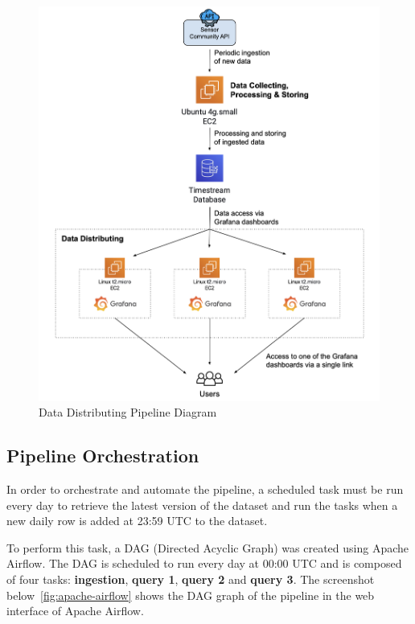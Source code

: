 \documentclass[12pt,oneside]{book} %
\begin{document}
\begin{figure}[H]
    \centering
    \includegraphics[width=1\linewidth]{images/pipeline.png}
    \caption{Data Distributing Pipeline Diagram}
\end{figure}

\newpage
\subsection{Pipeline Orchestration}

In order to orchestrate and automate the pipeline, a scheduled task must be run
every day to retrieve the latest version of the dataset and run the tasks when
a new daily row is added at 23:59 UTC to the dataset.\newline

To perform this task, a DAG (Directed Acyclic Graph) was created using Apache
Airflow. The DAG is scheduled to run every day at 00:00 UTC and is composed of
four tasks: \textbf{ingestion}, \textbf{query 1}, \textbf{query 2} and
\textbf{query 3}. The screenshot below~\ref{fig:apache-airflow} shows the DAG
graph of the pipeline in the web interface of Apache Airflow.\newline
\end{document}
